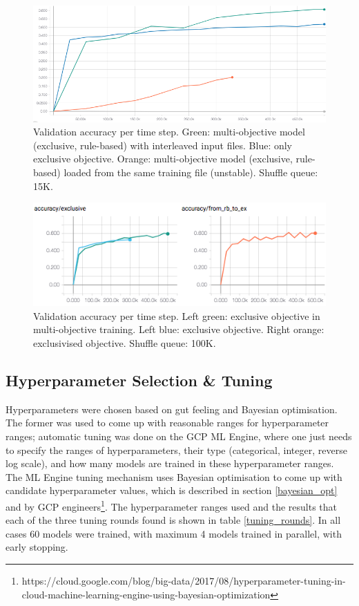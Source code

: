 \begin{figure}
  \includegraphics[width=\linewidth]{figures/multiobj/ex_vs_joint}
  \caption{Validation accuracy per time step. Green: multi-objective model (exclusive, rule-based) with interleaved input files. Blue: only exclusive objective. Orange: multi-objective model (exclusive, rule-based) loaded from the same training file (unstable). Shuffle queue: 15K.}
  \label{ex_vs_joint}
\end{figure}
\begin{figure}
  \includegraphics[width=\linewidth]{figures/multiobj/ex_vs_exclusivised}
  \caption{Validation accuracy per time step. Left green: exclusive objective in multi-objective training. Left blue: exclusive objective. Right orange: exclusivised objective. Shuffle queue: 100K.}
  \label{ex_vs_exclusivised}
\end{figure}



\subsection{Hyperparameter Selection \& Tuning}
\label{tuning}

Hyperparameters were chosen based on gut feeling and Bayesian optimisation.
The former was used to come up with reasonable ranges for hyperparameter ranges; automatic tuning was done on the GCP ML Engine, where one just needs to specify the ranges of hyperparameters, their type (categorical, integer, reverse log scale), and how many models are trained in these hyperparameter ranges.
The ML Engine tuning mechanism uses Bayesian optimisation to come up with candidate hyperparameter values, which is described in section \ref{bayesian_opt} and by GCP engineers\footnote{https://cloud.google.com/blog/big-data/2017/08/hyperparameter-tuning-in-cloud-machine-learning-engine-using-bayesian-optimization}.
The hyperparameter ranges used and the results that each of the three tuning rounds found is shown in table \ref{tuning_rounds}.
In all cases 60 models were trained, with maximum 4 models trained in parallel, with early stopping.

